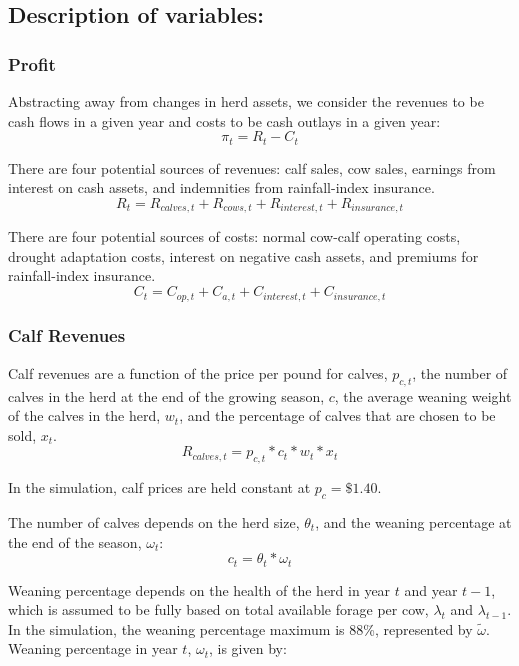 \documentclass[11pt]{article}
\begin{document}
\subsection{Description of variables:}


\subsubsection{Profit}
Abstracting away from changes in herd assets, we consider the revenues to be cash flows in a given year and costs to be cash outlays in a given year:
\begin{equation}
\pi_t = R_t - C_t
\end{equation}

There are four potential sources of revenues: calf sales, cow sales, earnings from interest on cash assets, and indemnities from rainfall-index insurance.
\begin{equation}
R_t = R_{calves,t} + R_{cows,t} + R_{interest,t} + R_{insurance,t}
\end{equation}

There are four potential sources of costs: normal cow-calf operating costs, drought adaptation costs, interest on negative cash assets, and premiums for rainfall-index insurance.
\begin{equation}
C_t = C_{op,t} + C_{a,t} + C_{interest,t} + C_{insurance,t}
\end{equation}

\subsubsection{Calf Revenues}
Calf revenues are a function of the price per pound for calves, $p_{c,t}$, the number of calves in the herd at the end of the growing season, $c$, the average weaning weight of the calves in the herd, $w_t$, and the percentage of calves that are chosen to be sold, $x_t$.
\begin{equation}
R_{calves,t} = p_{c,t} * c_t * w_t * x_t 
\end{equation}

In the simulation, calf prices are held constant at $p_{c} = \$1.40$. 

The number of calves depends on the herd size, $\theta_t$, and the weaning percentage at the end of the season, $\omega_t$:
\begin{equation}
c_t = \theta_t * \omega_t
\end{equation}

Weaning percentage depends on the health of the herd in year $t$ and year $t-1$, which is assumed to be fully based on total available forage per cow, $\lambda_t$ and $\lambda_{t-1}$. In the simulation, the weaning percentage maximum is 88\%, represented by $\tilde{\omega}$. Weaning percentage in year $t$, $\omega_t$, is given by:\\
\end{document}
